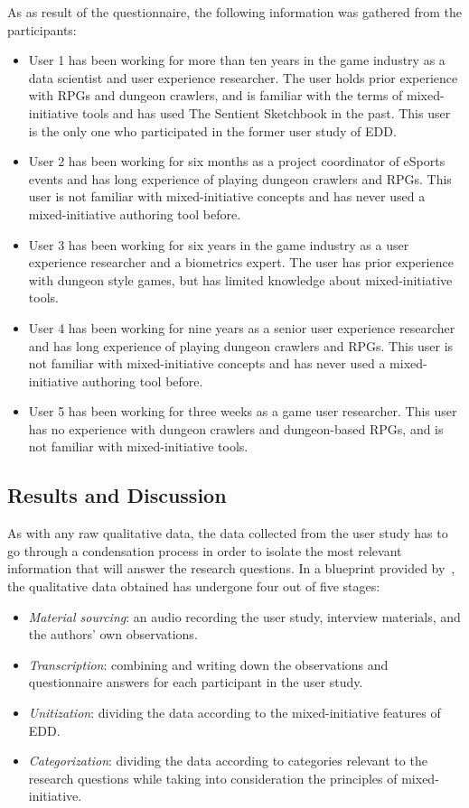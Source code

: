 As as result of the questionnaire, the following information was gathered from the participants:
\begin{itemize}
\item User 1 has been working for more than ten years in the game industry as a data scientist and user experience researcher. The user holds prior experience with RPGs and dungeon crawlers, and is familiar with the terms of mixed-initiative tools and has used The Sentient Sketchbook in the past. This user is the only one who participated in the former user study of EDD.
\item User 2 has been working for six months as a project coordinator of eSports events and has long experience of playing dungeon crawlers and RPGs. This user is not familiar with mixed-initiative concepts and has never used a mixed-initiative authoring tool before.
\item User 3 has been working for six years in the game industry as a user experience researcher and a biometrics expert. The user has prior experience with dungeon style games, but has limited knowledge about mixed-initiative tools.
\item User 4 has been working for nine years as a senior user experience researcher and has long experience of playing dungeon crawlers and RPGs. This user is not familiar with mixed-initiative concepts and has never used a mixed-initiative authoring tool before. 
\item User 5 has been working for three weeks as a game user researcher. This user has no experience with dungeon crawlers and dungeon-based RPGs, and is not familiar with mixed-initiative tools. 
\end{itemize}

\subsection{Results and Discussion} \label{p1conclusion} 

As with any raw qualitative data, the data collected from the user study has to go through a condensation process in order to isolate the most relevant information that will answer the research questions. In a blueprint provided by~, the qualitative data obtained has undergone four out of five stages: 
\begin{itemize}
\item \textit{Material sourcing}: an audio recording the user study, interview materials, and the authors’ own observations.
\item \textit{Transcription}: combining and writing down the observations and questionnaire answers for each participant in the user study.
\item \textit{Unitization}: dividing the data according to the mixed-initiative features of EDD.
\item \textit{Categorization}: dividing the data according to categories relevant to the research questions while taking into consideration the principles of mixed-initiative.
\end{itemize}

